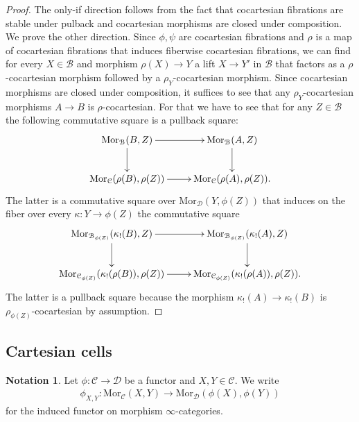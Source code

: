 \documentclass[10pt,oneside]{article}
\numberwithin{equation}{section} %
\numberwithin{figure}{section} %
\theoremstyle{plain}
\theoremstyle{definition}
\newtheorem{notation}[theorem]{Notation}
\newcommand{\mB}{{\mathcal B}}
\newcommand{\mC}{{\mathcal C}}
\newcommand{\mD}{{\mathcal D}}
\newcommand{\Mor}{{\mathrm{Mor}}}
\begin{document}
\begin{proof}

The only-if direction follows from the fact that cocartesian fibrations are stable under pulback and cocartesian morphisms are closed under composition.
We prove the other direction. Since $\phi, \psi$ are cocartesian fibrations and $\rho $ is a map of cocartesian fibrations that induces fiberwise cocartesian fibrations, we can find for every $X \in \mB$ and morphism $\rho(X) \to Y$ a lift $X \to Y'$ in $\mB$ that factors as a 
$\rho$-cocartesian morphism followed by a $\rho_Y$-cocartesian morphism.
Since cocartesian morphisms are closed under composition, it suffices to see that any $\rho_Y$-cocartesian morphisms $A \to B$ is $\rho$-cocartesian. For that we have to see that for any $Z \in \mB$
the following commutative square is a pullback square:
$$\begin{xy}
\xymatrix{
\Mor_{\mB}(B, Z) \ar[d]^{} \ar[r]
& \Mor_{\mB}(A, Z) \ar[d] 
\\ 
\Mor_{\mC}(\rho(B),\rho(Z)) \ar[r] & \Mor_{\mC}(\rho(A),\rho(Z)).}
\end{xy}$$
The latter is a commutative square over $\Mor_\mD(Y,\phi(Z))$
that induces on the fiber over every $\kappa: Y \to \phi(Z)$
the commutative square
$$\begin{xy}
\xymatrix{
\Mor_{\mB_{\phi(Z)}}(\kappa_!(B), Z) \ar[d]^{} \ar[r]
& \Mor_{\mB_{\phi(Z)}}(\kappa_!(A), Z) \ar[d] 
\\ 
\Mor_{\mC_{\phi(Z)}}(\kappa_!(\rho(B)), \rho(Z)) \ar[r] & \Mor_{\mC_{\phi(Z)}}(\kappa_!(\rho(A)), \rho(Z)).}
\end{xy}$$
The latter is a pullback square because the morphism $\kappa_!(A) \to \kappa_!(B) $ is $\rho_{\phi(Z)}$-cocartesian by assumption.
\end{proof}









\subsection{Cartesian cells}



\begin{notation}Let $\phi: \mC \to \mD$ be a functor and $X,Y \in \mC.$ 
We write
\begin{align*}
\phi_{X,Y}:\Mor_\mC(X,Y)\to\Mor_\mD(\phi(X),\phi(Y))
\end{align*}
for the induced functor on morphism $\infty$-categories.
\end{notation}
\end{document}
